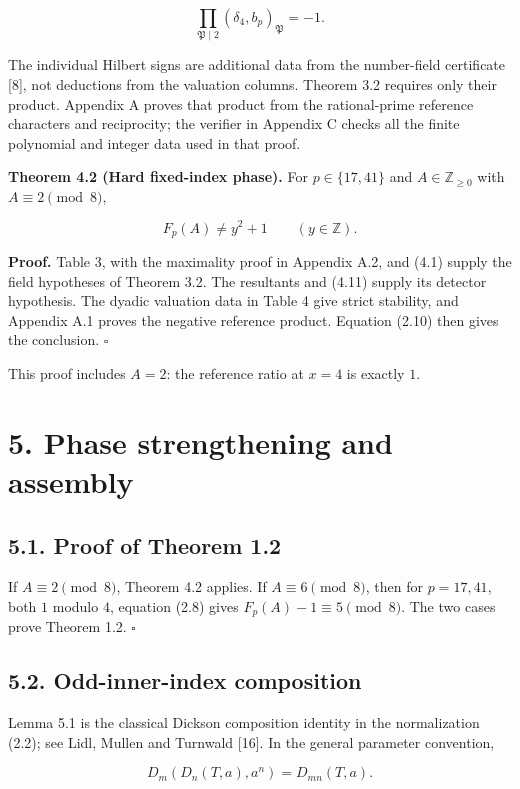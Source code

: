\documentclass[11pt,a4paper]{article}
\begin{document}
\[
\prod_{\mathfrak P\mid2}(\delta_4,b_p)_{\mathfrak P}=-1.
\tag{4.12}
\]

The individual Hilbert signs are additional data from the number-field
certificate {[}8{]}, not deductions from the valuation columns. Theorem
3.2 requires only their product. Appendix A proves that product from the
rational-prime reference characters and reciprocity; the verifier in
Appendix C checks all the finite polynomial and integer data used in
that proof.

\protect{}\label{thm-hard}
\textbf{Theorem 4.2 (Hard fixed-index phase).} For \(p\in\{17,41\}\) and
\(A\in\mathbb Z_{\ge0}\) with \(A\equiv2\pmod8\),

\[
F_p(A)\ne y^2+1
\qquad(y\in\mathbb Z).
\tag{4.13}
\]

\textbf{Proof.} Table 3, with the maximality proof in Appendix A.2, and
(4.1) supply the field hypotheses of Theorem 3.2. The resultants and
(4.11) supply its detector hypothesis. The dyadic valuation data in
Table 4 give strict stability, and Appendix A.1 proves the negative
reference product. Equation (2.10) then gives the conclusion.
\(\square\)

This proof includes \(A=2\): the reference ratio at \(x=4\) is exactly
\(1\).

\section{5. Phase strengthening and assembly}\label{propagation}

\subsection{5.1. Proof of Theorem 1.2}\label{proof-fixed}

If \(A\equiv2\pmod8\), Theorem 4.2 applies. If \(A\equiv6\pmod8\), then
for \(p=17,41\), both \(1\) modulo \(4\), equation (2.8) gives
\(F_p(A)-1\equiv5\pmod8\). The two cases prove Theorem 1.2. \(\square\)

\subsection{5.2. Odd-inner-index composition}\label{composition}

Lemma 5.1 is the classical Dickson composition identity in the
normalization (2.2); see Lidl, Mullen and Turnwald {[}16{]}. In the
general parameter convention,

\[
D_m(D_n(T,a),a^n)=D_{mn}(T,a).
\]
\end{document}
